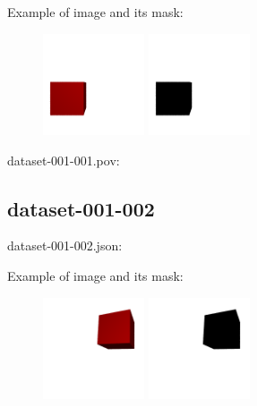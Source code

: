 Example of image and its mask:
\begin{center}
\begin{figure}[H]
\centering\includegraphics[width=3cm]{./img-001-001.png}
\centering\includegraphics[width=3cm]{./mask-001-001.png}
\end{figure}
\end{center}

dataset-001-001.pov:
\begin{scriptsize}
\begin{ttfamily}

\end{ttfamily}
\end{scriptsize}

\subsection{dataset-001-002}

dataset-001-002.json:
\begin{scriptsize}
\begin{ttfamily}

\end{ttfamily}
\end{scriptsize}

Example of image and its mask:
\begin{center}
\begin{figure}[H]
\centering\includegraphics[width=3cm]{./img-001-002.png}
\centering\includegraphics[width=3cm]{./mask-001-002.png}
\end{figure}
\end{center}

